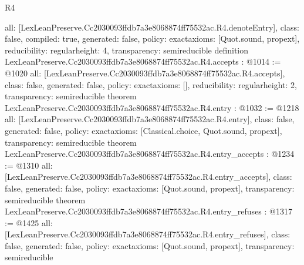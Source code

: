 \begin{lexlean}{R4}
\begin{coremodule}
{  all: [LexLeanPreserve.Cc2030093ffdb7a3e8068874ff75532ac.R4.denoteEntry],
  class: false,
  compiled: true,
  generated: false,
  policy: exact{axioms: [Quot.sound, propext]},
  reducibility: regular{height: 4},
  transparency: semireducible
}
definition LexLeanPreserve.Cc2030093ffdb7a3e8068874ff75532ac.R4.accepts : @1014 := @1020 {
  all: [LexLeanPreserve.Cc2030093ffdb7a3e8068874ff75532ac.R4.accepts],
  class: false,
  generated: false,
  policy: exact{axioms: []},
  reducibility: regular{height: 2},
  transparency: semireducible
}
theorem LexLeanPreserve.Cc2030093ffdb7a3e8068874ff75532ac.R4.entry : @1032 := @1218 {
  all: [LexLeanPreserve.Cc2030093ffdb7a3e8068874ff75532ac.R4.entry],
  class: false,
  generated: false,
  policy: exact{axioms: [Classical.choice, Quot.sound, propext]},
  transparency: semireducible
}
theorem LexLeanPreserve.Cc2030093ffdb7a3e8068874ff75532ac.R4.entry_accepts : @1234 := @1310 {
  all: [LexLeanPreserve.Cc2030093ffdb7a3e8068874ff75532ac.R4.entry_accepts],
  class: false,
  generated: false,
  policy: exact{axioms: [Quot.sound, propext]},
  transparency: semireducible
}
theorem LexLeanPreserve.Cc2030093ffdb7a3e8068874ff75532ac.R4.entry_refuses : @1317 := @1425 {
  all: [LexLeanPreserve.Cc2030093ffdb7a3e8068874ff75532ac.R4.entry_refuses],
  class: false,
  generated: false,
  policy: exact{axioms: [Quot.sound, propext]},
  transparency: semireducible
}


\end{coremodule}
\end{lexlean}
